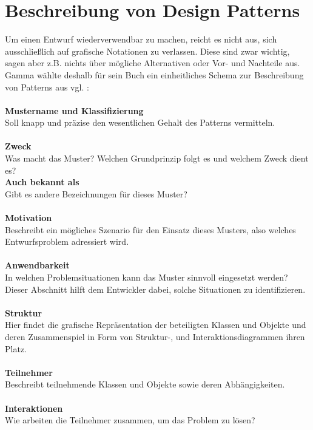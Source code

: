 \documentclass[fontsize=11pt,a4paper,final]{scrreprt}[2003/01/01]
\begin{document}
\section{Beschreibung von Design Patterns}\label{se:Beschreibung von Design Patterns}
Um einen Entwurf wiederverwendbar zu machen, reicht es nicht aus, sich ausschließlich auf grafische Notationen zu verlassen. Diese sind zwar wichtig, sagen aber z.B. nichts über mögliche Alternativen oder Vor- und Nachteile aus. Gamma wählte deshalb für sein Buch ein einheitliches Schema zur Beschreibung von Patterns aus vgl. \cite[S. 8-10]{gamma2004}: \\ \\
\textbf{Mustername und Klassifizierung} \\
Soll knapp und präzise den wesentlichen Gehalt des Patterns vermitteln. \\ \\
\textbf{Zweck} \\
Was macht das Muster? Welchen Grundprinzip folgt es und welchem Zweck dient es? \\
\newpage \noindent 
\textbf{Auch bekannt als} \\
Gibt es andere Bezeichnungen für dieses Muster? \\ \\
\textbf{Motivation} \\
Beschreibt ein mögliches Szenario für den Einsatz dieses Musters, also welches Entwurfsproblem adressiert wird. \\ \\
\textbf{Anwendbarkeit} \\
In welchen Problemsituationen kann das Muster sinnvoll eingesetzt werden? Dieser Abschnitt hilft dem Entwickler dabei, solche Situationen zu identifizieren. \\ \\
\textbf{Struktur} \\
Hier findet die grafische Repräsentation der beteiligten Klassen und Objekte und deren Zusammenspiel in Form von Struktur-, und Interaktionsdiagrammen ihren Platz. \\ \\
\textbf{Teilnehmer} \\
Beschreibt teilnehmende Klassen und Objekte sowie deren Abhängigkeiten. \\ \\
\textbf{Interaktionen} \\
Wie arbeiten die Teilnehmer zusammen, um das Problem zu lösen? \\ \\
\end{document}

